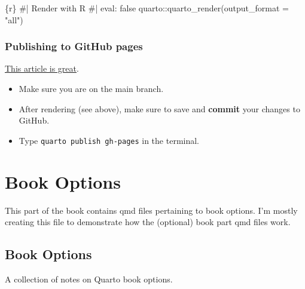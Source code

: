 \documentclass[
  letterpaper,
  DIV=11,
  numbers=noendperiod]{scrreprt}
\newenvironment{Shaded}{\begin{snugshade}}{\end{snugshade}}
\newcommand{\InformationTok}[1]{\textcolor[rgb]{0.37,0.37,0.37}{#1}}
\providecommand{\tightlist}{%
  \setlength{\itemsep}{0pt}\setlength{\parskip}{0pt}}\usepackage{longtable,booktabs,array}
\begin{document}
\begin{Shaded}
\begin{Highlighting}[]
\InformationTok{\textasciigrave{}\textasciigrave{}\textasciigrave{}\{r\}}
\InformationTok{\#| Render with R}
\InformationTok{\#| eval: false}
\InformationTok{quarto::quarto\_render(output\_format = "all")}
\InformationTok{\textasciigrave{}\textasciigrave{}\textasciigrave{}}
\end{Highlighting}
\end{Shaded}

\section*{Publishing to GitHub pages}\label{publishing-to-github-pages}


\href{https://quarto.org/docs/publishing/github-pages.html}{This article
is great}.

\begin{itemize}
\tightlist
\item
  Make sure you are on the main branch.
\item
  After rendering (see above), make sure to save and \textbf{commit}
  your changes to GitHub.
\item
  Type \texttt{quarto\ publish\ gh-pages} in the terminal.
\end{itemize}

\part{Book Options}

This part of the book contains qmd files pertaining to book options. I'm
mostly creating this file to demonstrate how the (optional) book part
qmd files work.

\chapter{Book Options}\label{sec-book-options}

A collection of notes on Quarto book options.
\end{document}
